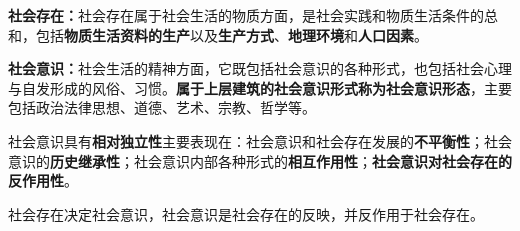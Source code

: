 \textbf{{社会存在}：}社会存在属于社会生活的物质方面，是社会实践和物质生活条件的总和，包括\textbf{{物质生活资料的生产}}以及\textbf{{生产方式}}、\textbf{{地理环境}}和\textbf{{人口因素}}。

{\textbf{社会意识}}\textbf{：}社会生活的精神方面，它既包括社会意识的各种形式，也包括社会心理与自发形成的风俗、习惯。\textbf{{属于上层建筑的社会意识形式称为社会意识形态}}，主要包括政治法律思想、道德、艺术、宗教、哲学等。

社会意识具有\textbf{{相对独立性}}主要表现在：社会意识和社会存在发展的\textbf{{不平衡性}}；社会意识的\textbf{{历史继承性}}；社会意识内部各种形式的\textbf{{相互作用性}}；\textbf{{社会意识对社会存在的反作用性}}。

{社会存在决定社会意识，社会意识是社会存在的反映，并反作用于社会存在。}
